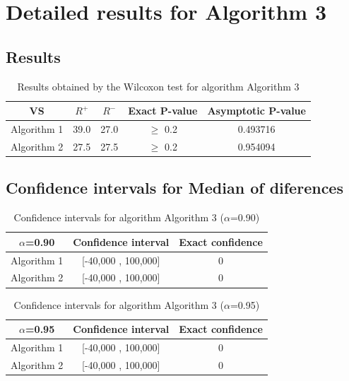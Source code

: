 \documentclass[a4paper,10pt]{article}
\begin{document}
 \clearpage 


\section{Detailed results for Algorithm 3}


\subsection{Results}

\begin{table}[!htp]
\centering\small
\begin{tabular}{
|c|c|c|c|c|}
\hline
 VS & $R^{+}$ & $R^{-}$ & Exact P-value & Asymptotic P-value \\ \hline 
Algorithm 1 & 39.0 & 27.0 & $\geq$ 0.2 & 0.493716\\ \hline 
Algorithm 2 & 27.5 & 27.5 & $\geq$ 0.2 & 0.954094\\ \hline 

\end{tabular}
\caption{Results obtained by the Wilcoxon test for algorithm Algorithm 3}
\end{table}

\subsection{Confidence intervals for Median of diferences}

\begin{table}[!htp]
\centering\small
\begin{tabular}{
|c|c|c|}
\hline
 $\alpha$=0.90 & Confidence interval & Exact confidence \\ \hline 
Algorithm 1 & [-40,000 , 100,000] & 0\\ \hline 
Algorithm 2 & [-40,000 , 100,000] & 0\\ \hline 

\end{tabular}
\caption{Confidence intervals for algorithm Algorithm 3 ($\alpha$=0.90)}
\end{table}
\begin{table}[!htp]
\centering\small
\begin{tabular}{
|c|c|c|}
\hline
 $\alpha$=0.95 & Confidence interval & Exact confidence \\ \hline 
Algorithm 1 & [-40,000 , 100,000] & 0\\ \hline 
Algorithm 2 & [-40,000 , 100,000] & 0\\ \hline 

\end{tabular}
\caption{Confidence intervals for algorithm Algorithm 3 ($\alpha$=0.95)}
\end{table}

 \clearpage 
\end{document}
